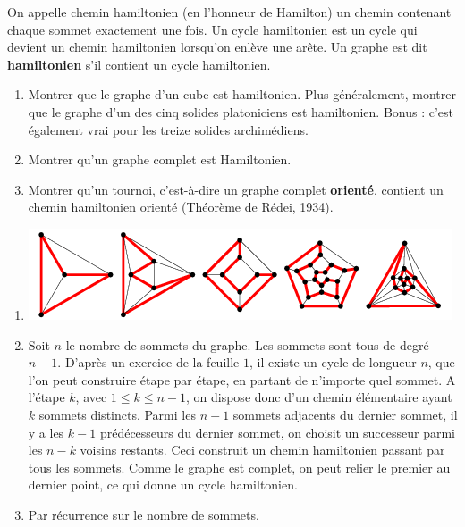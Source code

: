 \begin{exo}
On appelle chemin hamiltonien (en l'honneur de Hamilton) un chemin contenant chaque sommet exactement une fois. Un cycle hamiltonien est un cycle qui devient un chemin hamiltonien lorsqu'on enlève une arête. Un graphe est dit \textbf{hamiltonien} s'il contient un cycle hamiltonien.
\begin{enumerate}
\item Montrer que le graphe d'un cube est hamiltonien. Plus généralement, montrer que le graphe d'un des cinq solides platoniciens est hamiltonien. Bonus : c'est également vrai pour les treize solides archimédiens.%
\item Montrer qu'un graphe complet est Hamiltonien.
\item Montrer qu'un tournoi, c'est-à-dire un graphe complet \textbf{orienté}, contient un chemin hamiltonien orienté (Théorème de Rédei, 1934). %
\end{enumerate}
\begin{sol}
\begin{enumerate}
\item\begin{center}
\includegraphics[scale=0.5]{img/PlatonicHamiltonian.png}
\end{center}
\item Soit $n$ le nombre de sommets du graphe. Les sommets sont tous de degré $n-1$. D'après un exercice de la feuille $1$, il existe un cycle de longueur $n$, que l'on peut construire étape par étape, en partant de n'importe quel sommet. A l'étape $k$, avec $1\leq k\leq n-1$, on dispose donc d'un chemin élémentaire ayant $k$ sommets distincts. Parmi les $n-1$ sommets adjacents du dernier sommet, il y a les $k-1$ prédécesseurs du dernier sommet, on choisit un successeur parmi les $n-k$ voisins restants. Ceci construit un chemin hamiltonien passant par tous les sommets. Comme le graphe est complet, on peut relier le premier au dernier point, ce qui donne un cycle hamiltonien.
\item Par récurrence sur le nombre de sommets.
\end{enumerate}
\end{sol}
\end{exo}

